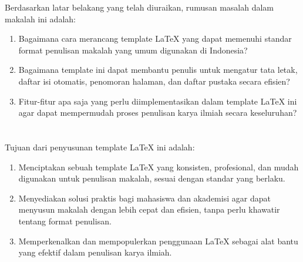 Berdasarkan latar belakang yang telah diuraikan, rumusan masalah dalam makalah ini adalah:

\begin{enumerate}
    \item Bagaimana cara merancang template LaTeX yang dapat memenuhi standar format penulisan makalah yang umum digunakan di Indonesia?
    \item Bagaimana template ini dapat membantu penulis untuk mengatur tata letak, daftar isi otomatis, penomoran halaman, dan daftar pustaka secara efisien?
    \item Fitur-fitur apa saja yang perlu diimplementasikan dalam template LaTeX ini agar dapat mempermudah proses penulisan karya ilmiah secara keseluruhan?
\end{enumerate}

%
%
%
\section{\Tujuan}

Tujuan dari penyusunan template LaTeX ini adalah:

\begin{enumerate}
    \item Menciptakan sebuah template LaTeX yang konsisten, profesional, dan mudah digunakan untuk penulisan makalah, sesuai dengan standar yang berlaku.
    \item Menyediakan solusi praktis bagi mahasiswa dan akademisi agar dapat menyusun makalah dengan lebih cepat dan efisien, tanpa perlu khawatir tentang format penulisan.
    \item Memperkenalkan dan mempopulerkan penggunaan LaTeX sebagai alat bantu yang efektif dalam penulisan karya ilmiah.
\end{enumerate}